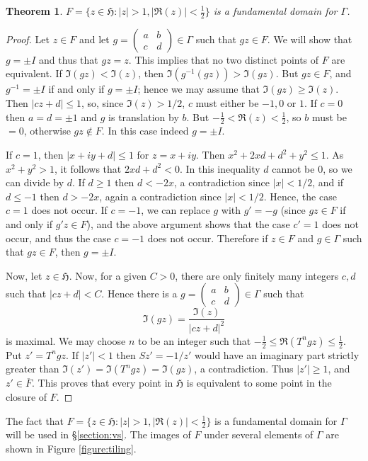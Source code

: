 \documentclass{article}
\newtheorem{theorem}{Theorem}
\begin{document}
\begin{theorem}
$F=\{z \in \mathfrak{H}:|z|>1, |\Re(z)|< \frac{1}{2}\}$ is a fundamental domain for $\Gamma$.
\end{theorem}
\begin{proof}
Let $z \in F$ and let $g=\begin{pmatrix}a&b\\c&d\end{pmatrix} \in \Gamma$ such that $gz \in F$. We will show that $g=\pm I$ and thus that $gz=z$. This implies that no two distinct points of $F$ are equivalent. If $\Im(gz)<\Im(z)$, then $\Im(g^{-1}(gz))>\Im(gz)$. But $gz \in F$, and $g^{-1}=\pm I$ if and only if $g=\pm I$; hence we may assume that $\Im(gz) \geq \Im(z)$. 
Then $|cz+d| \leq 1$, so, since $\Im(z)>1/2$, $c$ must either be $-1,0$ or $1$.
If $c=0$ then $a=d=\pm 1$ and $g$ is translation by $b$. But $-\frac{1}{2}<\Re(z)<\frac{1}{2}$, so $b$ must be $=0$, otherwise $gz \notin F$. In this case indeed $g=\pm I$.

If $c=1$, then $|x+iy+d| \leq 1$ for $z=x+iy$. Then $x^2+2xd+d^2+y^2 \leq 1$. As $x^2+y^2>1$, it follows that $2xd+d^2<0$. In this inequality $d$ cannot be 0, so we can divide by $d$. If $d \geq 1$ then $d<-2x$, a contradiction since $|x|<1/2$, and if $d \leq -1$ then $d>-2x$, again a contradiction since $|x|<1/2$. Hence, the case $c=1$ does not occur. If $c=-1$, we can replace $g$ with $g'=-g$ (since $gz \in F$ if and only if $g'z \in F$), and the above argument shows that the case $c'=1$ does not occur, and thus the case $c=-1$ does not occur. Therefore if $z \in F$ and $g \in \Gamma$ such that $gz \in F$, then $g=\pm I$.

Now, let $z \in \mathfrak{H}$. Now, for a given $C>0$, there are only finitely many integers $c,d$ such that $|cz+d|<C$. Hence there is a $g=\begin{pmatrix}a&b\\c&d\end{pmatrix} \in \Gamma$ such that
\[
\Im(gz)=\frac{\Im(z)}{|cz+d|^2}
\] 
is maximal.
We may choose $n$ to be an integer such that $-\frac{1}{2} \leq \Re(T^n gz) \leq \frac{1}{2}$. Put $z'=T^n gz$. If $|z'|<1$ then $Sz'=-1/z'$ would have an imaginary part strictly greater than $\Im(z')=\Im(T^n gz)=\Im(gz)$, a contradiction. Thus $|z'| \geq 1$, and $z' \in \overline{F}$. This proves that every point in $\mathfrak{H}$ is equivalent to some point in the closure of $F$. 
\end{proof}

The fact that $F=\{z \in \mathfrak{H}:|z|>1, |\Re(z)|< \frac{1}{2}\}$ is a fundamental domain for $\Gamma$ will be used in \S \ref{section:vs}.
The images of $F$ under several elements of $\Gamma$ are shown in Figure \ref{figure:tiling}. 
\end{document}
